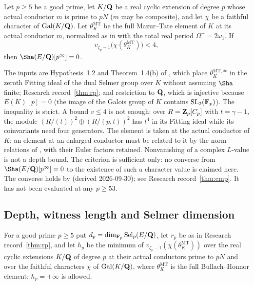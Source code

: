 \begin{researchrecord}\label{thm:depth}
Let $p\ge5$ be a good prime, let $K/\mathbf{Q}$ be a real cyclic extension of degree $p$ whose actual conductor $m$ is prime to $pN$ ($m$ may be composite), and let $\chi$ be a faithful character of $\operatorname{Gal}(K/\mathbf{Q})$. Let $\theta_K^{\mathrm{MT}}$ be the full Mazur--Tate element of $K$ at its actual conductor $m$, normalized as in \cite[Def.~2.2]{bh} with the total real period $\Omega^+=2\omega_1$. If
\[
v_{\zeta_p-1}\bigl(\chi(\theta_K^{\mathrm{MT}})\bigr)<4,
\]
then $\Sha(E/\Q)[p^\infty]=0$.
\end{researchrecord}
The inputs are Hypothesis~1.2 and Theorem~1.4(b) of \cite{bh}, which place $\theta_K^{\mathrm{MT},\#}$ in the zeroth Fitting ideal of the dual Selmer group over $K$ without assuming $\Sha$ finite; Research record~\ref{thm:rp}; and restriction to $\mathbf{Q}$, which is injective because $E(K)[p]=0$ (the image of the Galois group of $K$ contains $\mathrm{SL}_2(\mathbf{F}_p)$). The inequality is strict. A bound $v\le4$ is not enough: over $R=\mathbf{Z}_p[C_p]$ with $t=\gamma-1$, the module $(R/(t))^2\oplus(R/(p,t))^2$ has $t^4$ in its Fitting ideal while its coinvariants need four generators. The element is taken at the actual conductor of $K$; an element at an enlarged conductor must be related to it by the norm relations of \cite[Prop.~2.4]{bh}, with their Euler factors retained. Nonvanishing of a complex $L$-value is not a depth bound. The criterion is sufficient only: no converse from $\Sha(E/\Q)[p^\infty]=0$ to the existence of such a character value is claimed here. The converse holds by  (derived 2026-09-30); see Research record~\ref{thm:cmp}. It has not been evaluated at any $p\ge53$.

\subsection{Depth, witness length and Selmer dimension}\label{subsec:cmp}
For a good prime $p\ge5$ put $d_p=\dim_{\mathbf{F}_p}\operatorname{Sel}_p(E/\mathbf{Q})$, let $r_p$ be as in Research record~\ref{thm:rp}, and let $h_p$ be the minimum of $v_{\zeta_p-1}(\chi(\theta_K^{\mathrm{MT}}))$ over the real cyclic extensions $K/\mathbf{Q}$ of degree $p$ at their actual conductors prime to $pN$ and over the faithful characters $\chi$ of $\operatorname{Gal}(K/\mathbf{Q})$, where $\theta_K^{\mathrm{MT}}$ is the full Bullach--Honnor element; $h_p=+\infty$ is allowed.

